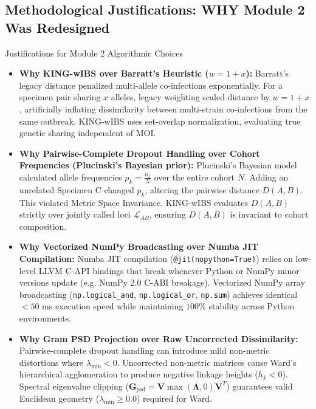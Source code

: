 \documentclass[11pt,a4paper]{article}
\begin{document}
\subsection{Methodological Justifications: WHY Module 2 Was Redesigned}

\begin{conceptbox}{Justifications for Module 2 Algorithmic Choices}
\begin{itemize}[leftmargin=*]
    \item \textbf{Why KING-wIBS over Barratt's Heuristic ($w = 1+x$):} Barratt's legacy distance penalized multi-allele co-infections exponentially. For a specimen pair sharing $x$ alleles, legacy weighting scaled distance by $w = 1+x$, artificially inflating dissimilarity between multi-strain co-infections from the same outbreak. KING-wIBS uses set-overlap normalization, evaluating true genetic sharing independent of MOI.
    \item \textbf{Why Pairwise-Complete Dropout Handling over Cohort Frequencies (Plucinski's Bayesian prior):} Plucinski's Bayesian model calculated allele frequencies $p_k = \frac{n_k}{N}$ over the entire cohort $N$. Adding an unrelated Specimen C changed $p_k$, altering the pairwise distance $D(A, B)$. This violated Metric Space Invariance. KING-wIBS evaluates $D(A, B)$ strictly over jointly called loci $\mathcal{L}_{AB}$, ensuring $D(A, B)$ is invariant to cohort composition.
    \item \textbf{Why Vectorized NumPy Broadcasting over Numba JIT Compilation:} Numba JIT compilation (\texttt{@jit(nopython=True)}) relies on low-level LLVM C-API bindings that break whenever Python or NumPy minor versions update (e.g. NumPy 2.0 C-ABI breakage). Vectorized NumPy array broadcasting (\texttt{np.logical\_and}, \texttt{np.logical\_or}, \texttt{np.sum}) achieves identical $<50\text{ ms}$ execution speed while maintaining $100\%$ stability across Python environments.
    \item \textbf{Why Gram PSD Projection over Raw Uncorrected Dissimilarity:} Pairwise-complete dropout handling can introduce mild non-metric distortions where $\lambda_{\text{min}} < 0$. Uncorrected non-metric matrices cause Ward's hierarchical agglomeration to produce negative linkage heights ($h_k < 0$). Spectral eigenvalue clipping ($\mathbf{G}_{\text{psd}} = \mathbf{V} \max(\mathbf{\Lambda}, 0) \mathbf{V}^T$) guarantees valid Euclidean geometry ($\lambda_{\text{min}} \ge 0.0$) required for Ward.
\end{itemize}
\end{conceptbox}
\end{document}
